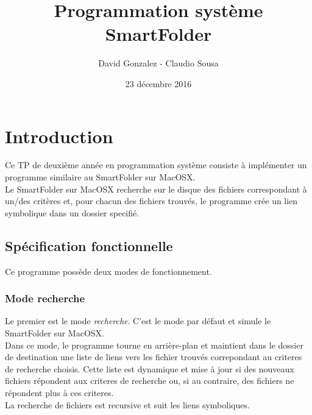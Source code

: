 \documentclass[11pt, a4paper]{article}
\begin{document}
\title
{
    \Huge{Programmation système} \\
    \Huge{SmartFolder}
}
\author
{
    \LARGE{David Gonzalez - Claudio Sousa}
}
\date{23 décembre 2016}
\maketitle

\begin{center}
\end{center}

\thispagestyle{empty}

\newpage

\section{Introduction}

Ce TP de deuxième année en programmation système consiste à implémenter un programme similaire au SmartFolder sur MacOSX. \\

Le SmartFolder sur MacOSX recherche sur le disque des fichiers correspondant à un/des critères et,
pour chacun des fichiers trouvés, le programme crée un lien symbolique dans un dossier specifié.

\subsection{Spécification fonctionnelle}
Ce programme possède deux modes de fonctionnement.

\subsubsection{Mode recherche}
Le premier est le mode \textit{recherche}.
C'est le mode par défaut et simule le SmartFolder sur MacOSX. \\

Dans ce mode, le programme tourne en arrière-plan et maintient dans le dossier de destination une liste de liens vers les fichier trouvés correpondant au criteres de recherche choisis.
Cette liste est dynamique et mise à jour si des nouveaux fichiers répondent aux criteres de recherche ou, si au contraire, des fichiers ne répondent plus à ces criteres. \\

La recherche de fichiers est recursive et suit les liens symboliques.
\end{document}
